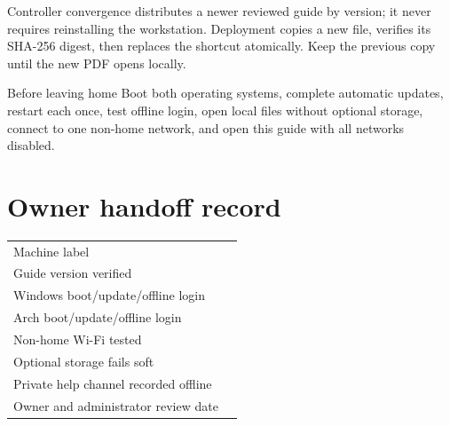 Controller convergence distributes a newer reviewed guide by version; it
never requires reinstalling the workstation. Deployment copies a new file,
verifies its SHA-256 digest, then replaces the shortcut atomically. Keep the
previous copy until the new PDF opens locally.


\begin{gate}{Before leaving home}
Boot both operating systems, complete automatic updates, restart each once,
test offline login, open local files without optional storage, connect to one
non-home network, and open this guide with all networks disabled.
\end{gate}

\section{Owner handoff record}

\begin{tabularx}{\linewidth}{@{}p{.38\linewidth}L@{}}
\toprule
Machine label & \rule{0pt}{2.5ex}\hrulefill\\
Guide version verified & \rule{0pt}{2.5ex}\hrulefill\\
Windows boot/update/offline login & \rule{0pt}{2.5ex}\hrulefill\\
Arch boot/update/offline login & \rule{0pt}{2.5ex}\hrulefill\\
Non-home Wi-Fi tested & \rule{0pt}{2.5ex}\hrulefill\\
Optional storage fails soft & \rule{0pt}{2.5ex}\hrulefill\\
Private help channel recorded offline & \rule{0pt}{2.5ex}\hrulefill\\
Owner and administrator review date & \rule{0pt}{2.5ex}\hrulefill\\
\bottomrule
\end{tabularx}


